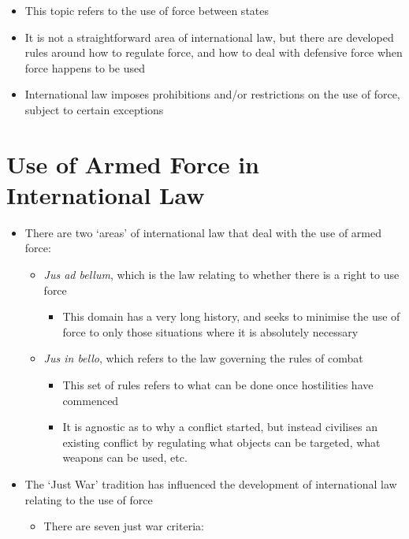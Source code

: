 \begin{itemize}
    \item This topic refers to the use of force between states
    \item It is not a straightforward area of international law, but there are developed rules around how to regulate force, and how to deal with defensive force when force happens to be used
    \item International law imposes prohibitions and/or restrictions on the use of force, subject to certain exceptions
\end{itemize}

\section{Use of Armed Force in International Law}
\begin{itemize}
    \item There are two `areas' of international law that deal with the use of armed force:
    \begin{itemize}
        \item \textit{Jus ad bellum}, which is the law relating to whether there is a right to use force
        \begin{itemize}
            \item This domain has a very long history, and seeks to minimise the use of force to only those situations where it is absolutely necessary
        \end{itemize}
        \item \textit{Jus in bello}, which refers to the law governing the rules of combat
        \begin{itemize}
            \item This set of rules refers to what can be done once hostilities have commenced
            \item It is agnostic as to why a conflict started, but instead civilises an existing conflict by regulating what objects can be targeted, what weapons can be used, etc.
        \end{itemize}
    \end{itemize}
    \item The `Just War' tradition has influenced the development of international law relating to the use of force
    \begin{itemize}
        \item There are seven just war criteria:
        \begin{enumerate}

\end{enumerate}
\end{itemize}
\end{itemize}
